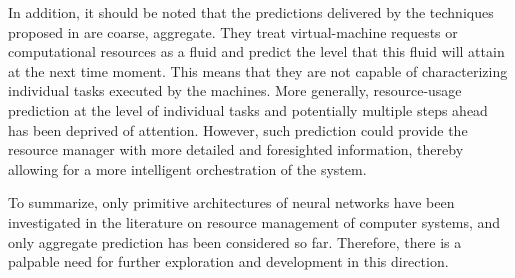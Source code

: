 In addition, it should be noted that the predictions delivered by the techniques
proposed in \cite{cao2014, dabbagh2015, ismaeel2015} are coarse, aggregate. They
treat virtual-machine requests or computational resources as a fluid and predict
the level that this fluid will attain at the next time moment. This means that
they are not capable of characterizing individual tasks executed by the
machines. More generally, resource-usage prediction at the level of individual
tasks and potentially multiple steps ahead has been deprived of attention.
However, such prediction could provide the resource manager with more detailed
and foresighted information, thereby allowing for a more intelligent
orchestration of the system.

To summarize, only primitive architectures of neural networks have been
investigated in the literature on resource management of computer systems, and
only aggregate prediction has been considered so far. Therefore, there is a
palpable need for further exploration and development in this direction.
